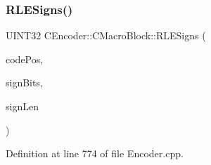 \subsubsection{\texorpdfstring{RLESigns()}{RLESigns()}}
{\footnotesize\ttfamily U\+I\+N\+T32 C\+Encoder\+::\+C\+Macro\+Block\+::\+R\+L\+E\+Signs (\begin{DoxyParamCaption}\item[{U\+I\+N\+T32}]{code\+Pos,  }\item[{U\+I\+N\+T32 $\ast$}]{sign\+Bits,  }\item[{U\+I\+N\+T32}]{sign\+Len }\end{DoxyParamCaption})\hspace{0.3cm}{\ttfamily [private]}}



Definition at line 774 of file Encoder.\+cpp.


